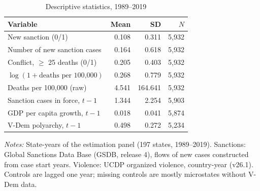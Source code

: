 \begin{table}[htbp]
\centering
\small
\caption{Descriptive statistics, 1989--2019}
\label{tab:descriptives}
\begin{threeparttable}
\begin{tabular}{lrrr}
\toprule
Variable & Mean & SD & $N$ \\
\midrule
New sanction (0/1) & 0.108 & 0.311 & 5,932 \\
Number of new sanction cases & 0.164 & 0.618 & 5,932 \\
Conflict, $\geq$ 25 deaths (0/1) & 0.205 & 0.403 & 5,932 \\
$\log(1 + \text{deaths per 100,000})$ & 0.268 & 0.779 & 5,932 \\
Deaths per 100,000 (raw) & 4.541 & 164.641 & 5,932 \\
Sanction cases in force, $t-1$ & 1.344 & 2.254 & 5,903 \\
GDP per capita growth, $t-1$ & 0.018 & 0.041 & 5,874 \\
V-Dem polyarchy, $t-1$ & 0.498 & 0.272 & 5,234 \\
\bottomrule
\end{tabular}
\begin{tablenotes}[flushleft]\footnotesize
\item \textit{Notes:} State-years of the estimation panel (197 states, 1989--2019). Sanctions: Global Sanctions Data Base (GSDB, release 4), flows of new cases constructed from case start years. Violence: UCDP organized violence, country-year (v26.1). Controls are lagged one year; missing controls are mostly microstates without V-Dem data.
\end{tablenotes}
\end{threeparttable}
\end{table}
